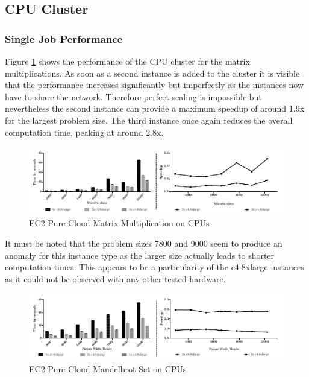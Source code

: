 \subsection{CPU Cluster}
\subsubsection*{Single Job Performance}

Figure \ref{img:ec2_cpu_matrix_multiplication} shows the performance of the CPU cluster for the matrix multiplications. As soon as a second instance is added to the cluster it is visible that the performance increases significantly but imperfectly as the instances now have to share the network. Therefore perfect scaling is impossible but nevertheless the second instance can provide a maximum speedup of around 1.9x for the largest problem size. The third instance once again reduces the overall computation time, peaking at around 2.8x.

\begin{figure}[!htb]
	\includegraphics[width=1.0\textwidth]{images/ec2_cpu_matrix_multiplication.pdf}
	\centering
	\caption{EC2 Pure Cloud Matrix Multiplication on CPUs}
	\label{img:ec2_cpu_matrix_multiplication}
\end{figure}

It must be noted that the problem sizes 7800 and 9000 seem to produce an anomaly for this instance type as the larger size actually leads to shorter computation times. This appears to be a particularity of the c4.8xlarge instances as it could not be observed with any other tested hardware.


\begin{figure}[!htb]
	\includegraphics[width=1.0\textwidth]{images/ec2_cpu_mandelbrot.pdf}
	\centering
	\caption{EC2 Pure Cloud Mandelbrot Set on CPUs}
	\label{img:ec2_cpu_mandelbrot}
\end{figure}

